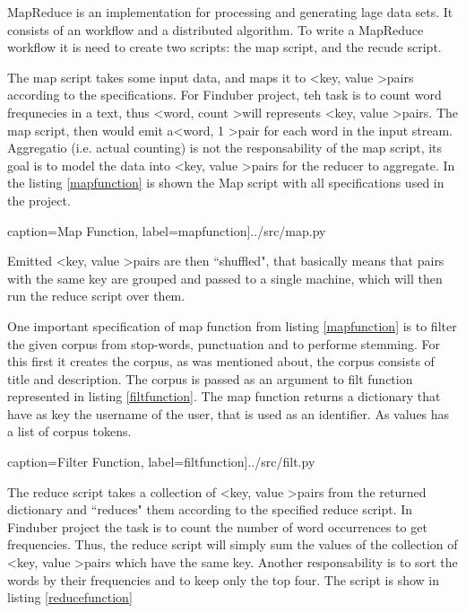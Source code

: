 MapReduce is an implementation for processing and generating lage data sets. It consists of an workflow and a distributed algorithm. To write a MapReduce workflow it is need to create two scripts: the map script, and the recude script. 

The map script takes some input data, and maps it to \textless key, value \textgreater pairs according to the specifications. For Finduber project, teh task is to count word frequnecies in a text, thus \textless word, count \textgreater will represents \textless key, value \textgreater pairs. The map script, then would emit a\textless word, 1 \textgreater pair for each word in the input stream. Aggregatio  (i.e. actual counting) is not the responsability of the map script, its goal is to model the data into \textless key, value \textgreater pairs for the reducer to aggregate. In the listing \ref{mapfunction} is shown the Map script with all specifications used in the project.

 caption={Map Function}, label=mapfunction]{../src/map.py}

Emitted \textless key, value \textgreater pairs are then ``shuffled", that basically means that pairs with the same key are grouped and passed to a single machine, which will then run the reduce script over them.

One important specification of map function from listing \ref{mapfunction} is to filter the given corpus from stop-words, punctuation and to performe stemming. For this first it creates the corpus, as was mentioned about, the corpus consists of title and description. The corpus is passed as an argument to filt function represented in listing \ref{filtfunction}. The map function returns a dictionary that have as key the username of the user, that is used as an identifier. As values has a list of corpus tokens. 

 caption={Filter Function}, label=filtfunction]{../src/filt.py}

The reduce script takes a collection of \textless key, value \textgreater pairs from the returned dictionary and ``reduces" them according to the specified reduce script. In Finduber project the task is to count the number of word occurrences to get frequencies. Thus, the reduce script will simply sum the values of the collection of \textless key, value \textgreater pairs which have the same key. Another responsability is to sort the words by their frequencies and to keep only the top four. The script is show in listing \ref{reducefunction}

